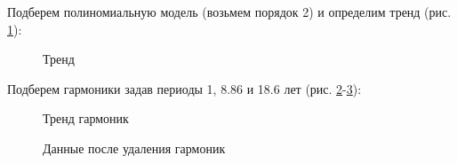 \documentclass[a4paper,oneside,14pt]{extreport}
\begin{document}
\newpage
Подберем полиномиальную модель (возьмем порядок 2) и определим тренд (рис. \ref{task3_predict_poly}):
\begin{figure}[!h]
	\caption{Тренд}
	\label{task3_predict_poly}
\end{figure}

Подберем гармоники задав периоды 1, 8.86 и 18.6 лет (рис. \ref{task3_predict_harm}-\ref{task3_del_harm}):
\begin{figure}[!h]
	\caption{Тренд гармоник}
	\label{task3_predict_harm}
\end{figure}

\newpage
\begin{figure}[!h]
	\caption{Данные после удаления гармоник}
	\label{task3_del_harm}
\end{figure}
\end{document}
